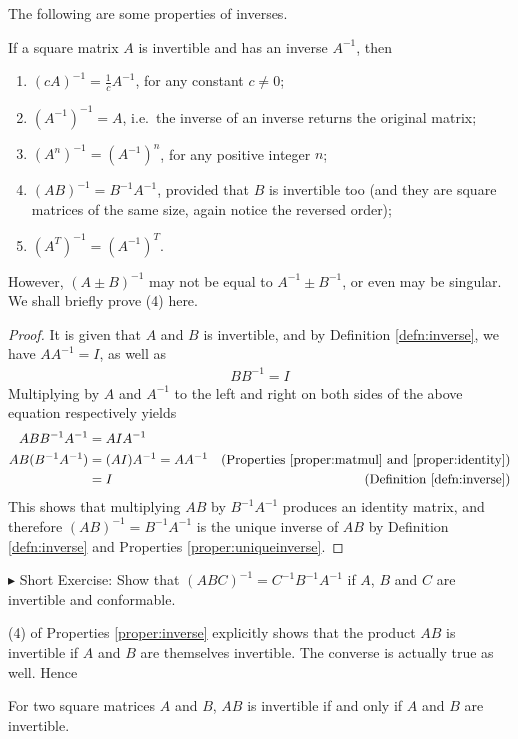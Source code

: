 The following are some properties of inverses.
\begin{proper}
\label{proper:inverse}
If a square matrix $A$ is invertible and has an inverse $A^{-1}$, then
\begin{enumerate}
\item $(cA)^{-1} = \frac{1}{c}A^{-1}$, for any constant $c \neq 0$;
\item $(A^{-1})^{-1} = A$, i.e.\ the inverse of an inverse returns the original matrix;
\item $(A^n)^{-1} = (A^{-1})^n$, for any positive integer $n$;
\item $(AB)^{-1} = B^{-1}A^{-1}$, provided that $B$ is invertible too (and they are square matrices of the same size, again notice the reversed order);
\item $(A^T)^{-1} = (A^{-1})^T$.
\end{enumerate}
\end{proper}
However, $(A\pm B)^{-1}$ may not be equal to $A^{-1} \pm B^{-1}$, or even may be singular. We shall briefly prove (4) here.
\begin{proof}
It is given that $A$ and $B$ is invertible, and by Definition \ref{defn:inverse}, we have $AA^{-1} = I$, as well as 
\begin{align*}
BB^{-1} = I    
\end{align*}
Multiplying by $A$ and $A^{-1}$ to the left and right on both sides of the above equation respectively yields
\begin{align*}
ABB^{-1}A^{-1} &= AIA^{-1} \\
AB(B^{-1}A^{-1}) &= (AI)A^{-1} = AA^{-1} & \text{(Properties \ref{proper:matmul} and \ref{proper:identity})} \\
&= I & \text{(Definition \ref{defn:inverse})}
\end{align*}
This shows that multiplying $AB$ by $B^{-1}A^{-1}$ produces an identity matrix, and therefore $(AB)^{-1} = B^{-1}A^{-1}$ is the unique inverse of $AB$ by Definition \ref{defn:inverse} and Properties \ref{proper:uniqueinverse}.
\end{proof}
$\blacktriangleright$ Short Exercise: Show that $(ABC)^{-1} = C^{-1}B^{-1}A^{-1}$ if $A$, $B$ and $C$ are invertible and conformable.\footnotemark\par
(4) of Properties \ref{proper:inverse} explicitly shows that the product $AB$ is invertible if $A$ and $B$ are themselves invertible. The converse is actually true as well.\footnotemark{} Hence
\begin{proper}
\label{proper:ABinv}
For two square matrices $A$ and $B$, $AB$ is invertible if and only if $A$ and $B$ are invertible.
\end{proper}


